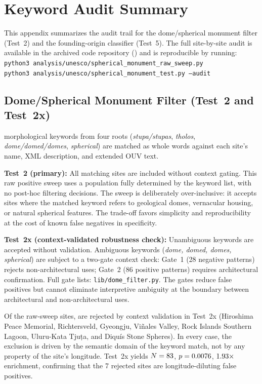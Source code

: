 \documentclass[HARVARD,twocolumn]{USG}
\begin{document}
\appendix
\newpage

\section{Keyword Audit Summary}
\label{sec:kwdaudit}

This appendix summarizes the audit trail for the dome/spherical monument
filter (Test~2) and the founding-origin classifier (Test~5).
The full site-by-site audit is available in the archived code repository
(\citealt{tenenbaum2026audit}) and is reproducible by running:\\
\texttt{python3 analysis/unesco/spherical\_monument\_raw\_sweep.py}\\
\texttt{python3 analysis/unesco/spherical\_monument\_test.py --audit}

\subsection{Dome/Spherical Monument Filter (Test~2 and Test~2x)}
\label{sec:kwdaudit_dome}

\NcircKeywords{} morphological keywords from four roots
(\textit{stupa/stupas}, \textit{tholos}, \textit{dome/domed/domes},
\textit{spherical}) are matched as whole words against each site's
name, XML description, and extended OUV text.

\textbf{Test~2 (primary):} All \NcircTotal{} matching sites are included
without context gating. This raw positive sweep uses a population fully
determined by the keyword list, with no post-hoc filtering decisions.
The sweep is deliberately over-inclusive: it accepts sites where the
matched keyword refers to geological domes, vernacular housing, or
natural spherical features. The trade-off favors simplicity and
reproducibility at the cost of known false negatives in specificity.

\textbf{Test~2x (context-validated robustness check):} Unambiguous keywords
are accepted without validation. Ambiguous keywords (\textit{dome, domed,
domes, spherical}) are subject to a two-gate context check: Gate~1
(28 negative patterns) rejects non-architectural uses; Gate~2
(86 positive patterns) requires architectural confirmation. Full gate
lists: \texttt{lib/dome\_filter.py}. The gates reduce false positives
but cannot eliminate interpretive ambiguity at the boundary between
architectural and non-architectural uses.

Of the \NcircTotal{} raw-sweep sites, \NcircContextRejected{} are
rejected by context validation in Test~2x (Hiroshima Peace Memorial,
Richtersveld, Gyeongju, Vi\~{n}ales Valley, Rock Islands Southern Lagoon,
Uluru-Kata Tju\d{t}a, and Diqu\'{i}s Stone Spheres). In every case, the
exclusion is driven by the semantic domain of the keyword match, not by
any property of the site's longitude. Test~2x yields $N = 83$,
$p = 0.0076$, $1.93\times$ enrichment, confirming that the 7 rejected
sites are longitude-diluting false positives.
\end{document}
